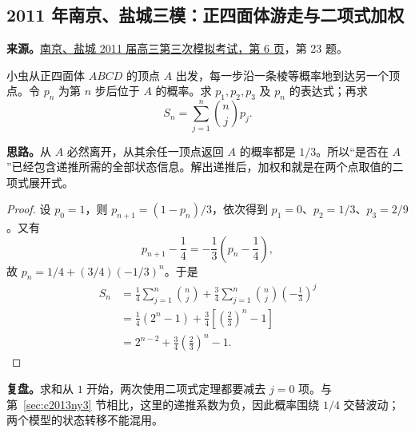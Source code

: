 \documentclass[UTF8]{ctexart}
\begin{document}
\subsection{2011 年南京、盐城三模：正四面体游走与二项式加权}\label{sec:c2011ny3}
\textbf{来源。}\href{https://doc.xuehai.net/b699d388c622547cec887cbae-6.html}{南京、盐城 2011 届高三第三次模拟考试，第 6 页}，第 23 题。
\begin{example}[题意]
小虫从正四面体 $ABCD$ 的顶点 $A$ 出发，每一步沿一条棱等概率地到达另一个顶点。令 $p_n$ 为第 $n$ 步后位于 $A$ 的概率。求 $p_1,p_2,p_3$ 及 $p_n$ 的表达式；再求
\[
S_n=\sum_{j=1}^{n}\binom njp_j.
\]
\end{example}
\textbf{思路。}从 $A$ 必然离开，从其余任一顶点返回 $A$ 的概率都是 $1/3$。所以“是否在 $A$”已经包含递推所需的全部状态信息。解出递推后，加权和就是在两个点取值的二项式展开式。
\begin{proof}
设 $p_0=1$，则 $p_{n+1}=(1-p_n)/3$，依次得到 $p_1=0$、$p_2=1/3$、$p_3=2/9$。又有
\[
p_{n+1}-\frac14=-\frac13\left(p_n-\frac14\right),
\]
故 $p_n=1/4+(3/4)(-1/3)^n$。于是
\begin{align*}
S_n
&=\frac14\sum_{j=1}^{n}\binom nj
 +\frac34\sum_{j=1}^{n}\binom nj\left(-\frac13\right)^j\\
&=\frac14(2^n-1)+\frac34\left[\left(\frac23\right)^n-1\right]\\
&=\boxed{2^{n-2}+\frac34\left(\frac23\right)^n-1}.
\end{align*}
\end{proof}
\textbf{复盘。}求和从 $1$ 开始，两次使用二项式定理都要减去 $j=0$ 项。与第~\ref{sec:c2013ny3} 节相比，这里的递推系数为负，因此概率围绕 $1/4$ 交替波动；两个模型的状态转移不能混用。
\end{document}
